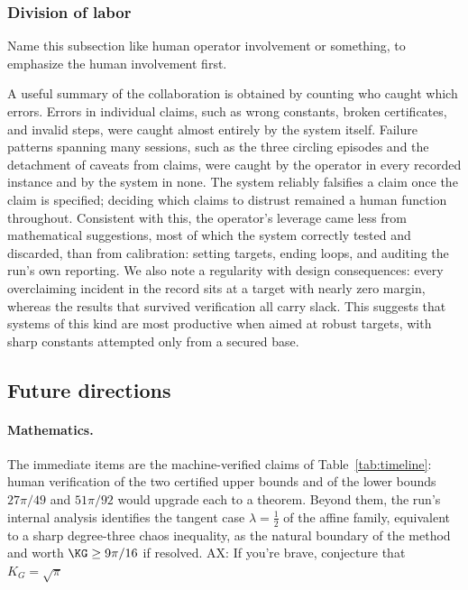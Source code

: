 \subsubsection{Division of labor}

{\color{red}Name this subsection like human operator involvement or something, to emphasize the human involvement first.}

A useful summary of the collaboration is obtained by counting who caught
which errors. Errors in individual claims, such as wrong constants, broken
certificates, and invalid steps, were caught almost entirely by the system
itself. Failure patterns spanning many sessions, such as the three circling
episodes and the detachment of caveats from claims, were caught by the
operator in every recorded instance and by the system in none. The system
reliably falsifies a claim once the claim is specified; deciding which
claims to distrust remained a human function throughout. Consistent with
this, the operator's leverage came less from mathematical suggestions, most
of which the system correctly tested and discarded, than from calibration:
setting targets, ending loops, and auditing the run's own reporting. We also
note a regularity with design consequences: every overclaiming incident in
the record sits at a target with nearly zero margin, whereas the results
that survived verification all carry slack. This suggests that systems of
this kind are most productive when aimed at robust targets, with sharp
constants attempted only from a secured base.

\subsection{Future directions}
\label{sec:ai-future}

\paragraph{Mathematics.}
The immediate items are the machine-verified claims of
Table~\ref{tab:timeline}: human verification of the two certified upper
bounds and of the lower bounds $27\pi/49$ and $51\pi/92$ would upgrade each
to a theorem. Beyond them, the run's internal analysis identifies the
tangent case $\lambda=\tfrac12$ of the affine family, equivalent to a sharp
degree-three chaos inequality, as the natural boundary of the method and
worth $\KG\ge9\pi/16$ if resolved.
{\color{red}AX: If you're brave, conjecture that \(K_G = \sqrt{\pi}\)}

